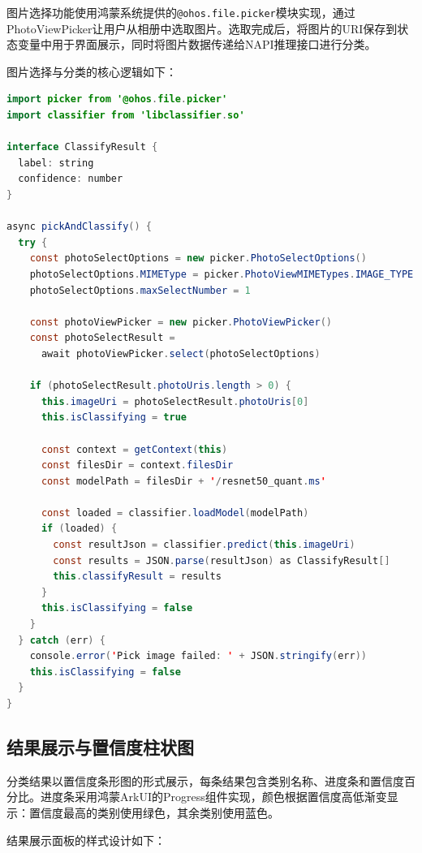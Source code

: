 图片选择功能使用鸿蒙系统提供的\texttt{@ohos.file.picker}模块实现，通过PhotoViewPicker让用户从相册中选取图片。选取完成后，将图片的URI保存到状态变量中用于界面展示，同时将图片数据传递给NAPI推理接口进行分类。

图片选择与分类的核心逻辑如下：

\begin{lstlisting}[language=Java, caption={图片选择与分类实现}]
import picker from '@ohos.file.picker'
import classifier from 'libclassifier.so'

interface ClassifyResult {
  label: string
  confidence: number
}

async pickAndClassify() {
  try {
    const photoSelectOptions = new picker.PhotoSelectOptions()
    photoSelectOptions.MIMEType = picker.PhotoViewMIMETypes.IMAGE_TYPE
    photoSelectOptions.maxSelectNumber = 1

    const photoViewPicker = new picker.PhotoViewPicker()
    const photoSelectResult =
      await photoViewPicker.select(photoSelectOptions)

    if (photoSelectResult.photoUris.length > 0) {
      this.imageUri = photoSelectResult.photoUris[0]
      this.isClassifying = true

      const context = getContext(this)
      const filesDir = context.filesDir
      const modelPath = filesDir + '/resnet50_quant.ms'

      const loaded = classifier.loadModel(modelPath)
      if (loaded) {
        const resultJson = classifier.predict(this.imageUri)
        const results = JSON.parse(resultJson) as ClassifyResult[]
        this.classifyResult = results
      }
      this.isClassifying = false
    }
  } catch (err) {
    console.error('Pick image failed: ' + JSON.stringify(err))
    this.isClassifying = false
  }
}
\end{lstlisting}

\subsection{结果展示与置信度柱状图}

分类结果以置信度条形图的形式展示，每条结果包含类别名称、进度条和置信度百分比。进度条采用鸿蒙ArkUI的Progress组件实现，颜色根据置信度高低渐变显示：置信度最高的类别使用绿色，其余类别使用蓝色。

结果展示面板的样式设计如下：

